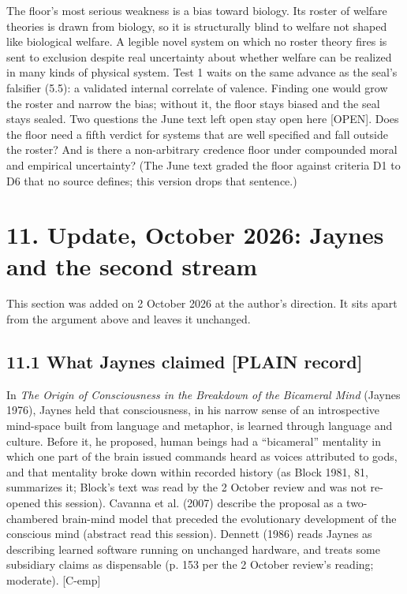 \documentclass[11pt]{article}
\newcommand{\register}[1]{{\ttfamily\small #1}}
\begin{document}
The floor's most serious weakness is a bias toward biology. Its roster of welfare theories is drawn from biology, so it is structurally blind to welfare not shaped like biological welfare. A legible novel system on which no roster theory fires is sent to exclusion despite real uncertainty about whether welfare can be realized in many kinds of physical system. Test 1 waits on the same advance as the seal's falsifier (5.5): a validated internal correlate of valence. Finding one would grow the roster and narrow the bias; without it, the floor stays biased and the seal stays sealed. Two questions the June text left open stay open here \register{[OPEN]}. Does the floor need a fifth verdict for systems that are well specified and fall outside the roster? And is there a non-arbitrary credence floor under compounded moral and empirical uncertainty? (The June text graded the floor against criteria D1 to D6 that no source defines; this version drops that sentence.)

\section*{11. Update, October 2026: Jaynes and the second stream}

This section was added on 2 October 2026 at the author's direction. It sits apart from the argument above and leaves it unchanged.

\subsection*{11.1 What Jaynes claimed \register{[PLAIN record]}}

In \emph{The Origin of Consciousness in the Breakdown of the Bicameral Mind} (Jaynes 1976), Jaynes held that consciousness, in his narrow sense of an introspective mind-space built from language and metaphor, is learned through language and culture. Before it, he proposed, human beings had a ``bicameral'' mentality in which one part of the brain issued commands heard as voices attributed to gods, and that mentality broke down within recorded history (as Block 1981, 81, summarizes it; Block's text was read by the 2 October review and was not re-opened this session). Cavanna et al. (2007) describe the proposal as a two-chambered brain-mind model that preceded the evolutionary development of the conscious mind (abstract read this session). Dennett (1986) reads Jaynes as describing learned software running on unchanged hardware, and treats some subsidiary claims as dispensable (p. 153 per the 2 October review's reading; moderate). [C-emp]
\end{document}
